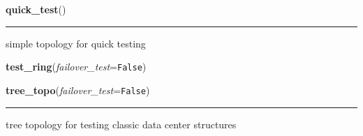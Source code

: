     \vspace{0.5ex}

\hspace{.8\funcindent}\begin{boxedminipage}{\funcwidth}

    \raggedright \textbf{quick\_test}()

    \vspace{-1.5ex}

    \rule{\textwidth}{0.5\fboxrule}
\setlength{\parskip}{2ex}
    simple topology for quick testing

\setlength{\parskip}{1ex}
    \end{boxedminipage}

    \label{make_topology:test_ring}

    \vspace{0.5ex}

\hspace{.8\funcindent}\begin{boxedminipage}{\funcwidth}

    \raggedright \textbf{test\_ring}(\textit{failover\_test}={\tt False})

\setlength{\parskip}{2ex}
\setlength{\parskip}{1ex}
    \end{boxedminipage}

    \label{make_topology:tree_topo}

    \vspace{0.5ex}

\hspace{.8\funcindent}\begin{boxedminipage}{\funcwidth}

    \raggedright \textbf{tree\_topo}(\textit{failover\_test}={\tt False})

    \vspace{-1.5ex}

    \rule{\textwidth}{0.5\fboxrule}
\setlength{\parskip}{2ex}
    tree topology for testing classic data center structures

\setlength{\parskip}{1ex}
    \end{boxedminipage}

    \label{make_topology:basic_3_ring}

    \vspace{0.5ex}

